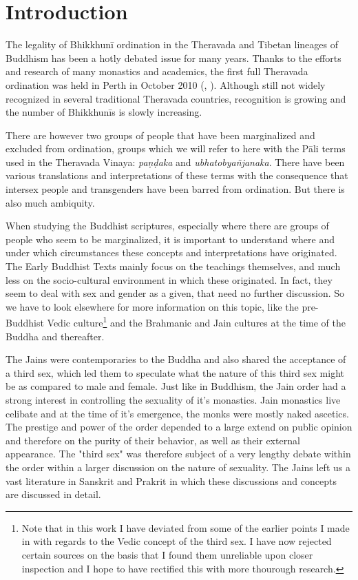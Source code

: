 \section{Introduction}
The legality of Bhikkhunī ordination in the Theravada and Tibetan lineages of Buddhism has been a hotly debated issue for many years. Thanks to the efforts and research of many monastics and academics, the first full Theravada ordination was held in Perth in October 2010 (\cite{sujato2009}, \cite{analayo2013}). Although still not widely recognized in several traditional Theravada countries, recognition is growing and the number of Bhikkhunīs is slowly increasing. 

There are however two groups of people that have been marginalized and excluded from ordination, groups which we will refer to here with the Pāli terms used in the Theravada Vinaya: {\em paṇḍaka} and {\em ubhatob­yañ­janaka}. There have been various translations and interpretations of these terms with the consequence that intersex people and transgenders have been barred from ordination. But there is also much ambiquity.

When studying the Buddhist scriptures, especially where there are groups of people who seem to be marginalized, it is important to understand where and under which circumstances these concepts and interpretations have originated. The Early Buddhist Texts mainly focus on the teachings themselves, and much less on the socio-cultural environment in which these originated. In fact, they seem to deal with sex and gender as a given, that need no further discussion. So we have to look elsewhere for more information on this topic, like the pre-Buddhist Vedic culture\footnote{Note that in this work I have deviated from some of the earlier points I made in \cite{vimala} with regards to the Vedic concept of the third sex. I have now rejected certain sources on the basis that I found them unreliable upon closer inspection and I hope to have rectified this with more thourough research.} and the Brahmanic and Jain cultures at the time of the Buddha and thereafter. 

The Jains were contemporaries to the Buddha and also shared the acceptance of a third sex, which led them to speculate what the nature of this third sex might be as compared to male and female. Just like in Buddhism, the Jain order had a strong interest in controlling the sexuality of it's monastics. Jain monastics live celibate and at the time of it's emergence, the monks were mostly naked ascetics. The prestige and power of the order depended to a large extend on public opinion and therefore on the purity of their behavior, as well as their external appearance. The "third sex" was therefore subject of a very lengthy debate within the order within a larger discussion on the nature of sexuality. The Jains left us a vast literature in Sanskrit and Prakrit in which these discussions and concepts are discussed in detail.